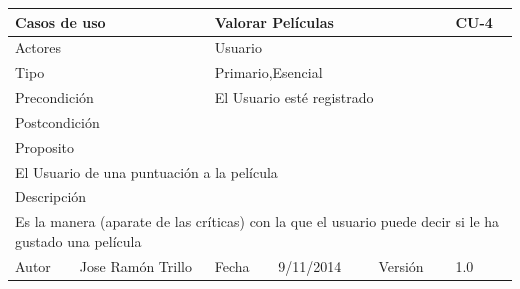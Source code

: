 \documentclass{article}
\begin{document}
\begin{table}[h]
\begin{tabular}{|l|l|l|l|l|l|}
\hline
\multicolumn{2}{|p{2cm}|}{Casos de uso}  & \multicolumn{3}{p{7cm}|}{\textbf{Valorar Películas}} & CU-4 \\
\hline
\multicolumn{2}{|p{2cm}|}{Actores}       & \multicolumn{4}{p{8cm}|}{Usuario}        \\
\hline
\multicolumn{2}{|p{2cm}|}{Tipo}          & \multicolumn{4}{p{8cm}|}{Primario,Esencial}        \\
\hline
\multicolumn{2}{|p{2cm}|}{Precondición}  & \multicolumn{4}{p{8cm}|}{El Usuario esté registrado}        \\
\hline
\multicolumn{2}{|p{2cm}|}{Postcondición} & \multicolumn{4}{p{8cm}|}{}        \\
\hline
\multicolumn{6}{|p{10cm}|}{Proposito}                                   \\
\hline
\multicolumn{6}{|p{10cm}|}{El Usuario de una puntuación a la película}                                            \\
\hline
\multicolumn{6}{|p{10cm}|}{Descripción}                                 \\
\hline
\multicolumn{6}{|p{10cm}|}{Es la manera (aparate de las críticas) con la que el usuario puede decir si le ha gustado una película }                                            \\
\hline
Autor              &      Jose Ramón Trillo        & Fecha    & 9/11/2014    &   Versión  &1.0\\
\hline
\end{tabular}
\end{table}
\end{document}
